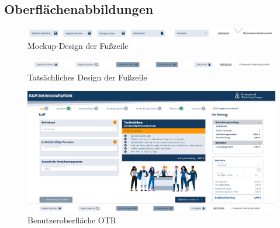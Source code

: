 \subsection{Oberflächenabbildungen}
	\label{uisection}
\begin{figure}[!htb]
	\includegraphics[width=\textwidth, height=\textheight, keepaspectratio]{anhang/mockup_footer.png}
	\caption{Mockup-Design der Fußzeile}
	\label{mockup}
\end{figure}
\begin{figure}[!htb]
	\includegraphics[width=\textwidth, height=\textheight, keepaspectratio]{anhang/actual_footer.png}
	\caption{Tatsächliches Design der Fußzeile}
	\label{actualfooter}
\end{figure}
\begin{figure}[!htb]
	\includegraphics[width=\textwidth,  keepaspectratio]{anhang/otr.png}
	\caption{Benutzeroberfläche OTR}
	\label{otr_figure}
\end{figure}